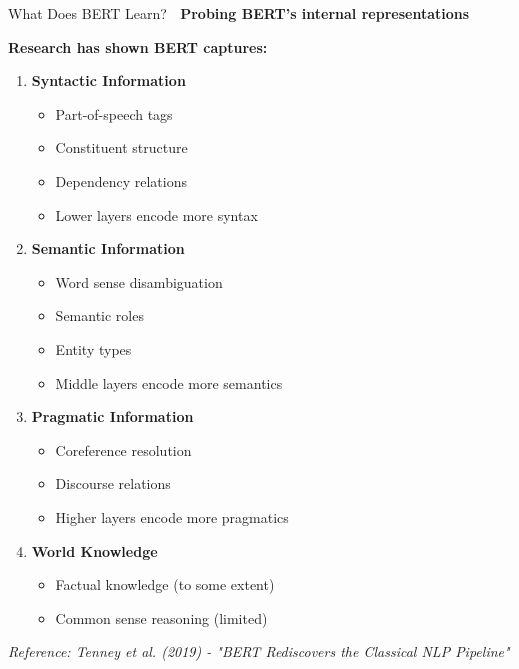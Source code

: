\documentclass[aspectratio=169]{beamer}
\begin{document}
\begin{frame}[shrink=10]{What Does BERT Learn? 🧠}
\textbf{Probing BERT's internal representations}

\vspace{1em}

\textbf{Research has shown BERT captures:}

\begin{enumerate}\setlength{\itemsep}{0pt}
    \item \textbf{Syntactic Information}
    \begin{itemize}\setlength{\itemsep}{0pt}
        \item Part-of-speech tags
        \item Constituent structure
        \item Dependency relations
        \item Lower layers encode more syntax
    \end{itemize}

    \item \textbf{Semantic Information}
    \begin{itemize}\setlength{\itemsep}{0pt}
        \item Word sense disambiguation
        \item Semantic roles
        \item Entity types
        \item Middle layers encode more semantics
    \end{itemize}

    \item \textbf{Pragmatic Information}
    \begin{itemize}\setlength{\itemsep}{0pt}
        \item Coreference resolution
        \item Discourse relations
        \item Higher layers encode more pragmatics
    \end{itemize}

    \item \textbf{World Knowledge}
    \begin{itemize}\setlength{\itemsep}{0pt}
        \item Factual knowledge (to some extent)
        \item Common sense reasoning (limited)
    \end{itemize}
\end{enumerate}

\vspace{0.5em}
\small
\textit{Reference: Tenney et al. (2019) - "BERT Rediscovers the Classical NLP Pipeline"}
\end{frame}
\end{document}
